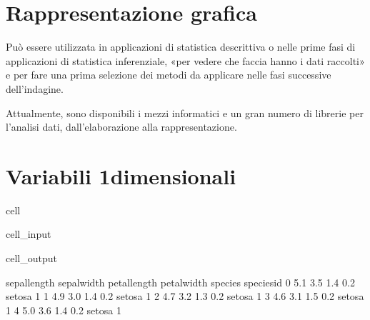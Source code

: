 \documentclass[letterpaper,10pt,italian]{jupyterBook}
\begin{document}
\section{Rappresentazione grafica}
\label{\detokenize{ch/statistics/descriptive:rappresentazione-grafica}}
\sphinxAtStartPar
{} Può essere utilizzata in applicazioni di statistica descrittiva o nelle prime fasi di applicazioni di statistica inferenziale, «per vedere che faccia hanno i dati raccolti» e per fare una prima selezione dei metodi da applicare nelle fasi successive dell’indagine.

\sphinxAtStartPar
Attualmente, sono disponibili i mezzi informatici e un gran numero di librerie per l’analisi dati, dall’elaborazione alla rappresentazione.


\section{Variabili 1\sphinxhyphen{}dimensionali}
\label{\detokenize{ch/statistics/descriptive:variabili-1-dimensionali}}
\begin{sphinxuseclass}{cell}\begin{sphinxVerbatimInput}

\begin{sphinxuseclass}{cell_input}
\begin{sphinxVerbatim}[commandchars=\\\{\}]
   
  
\end{sphinxVerbatim}

\end{sphinxuseclass}\end{sphinxVerbatimInput}
\begin{sphinxVerbatimOutput}

\begin{sphinxuseclass}{cell_output}
\begin{sphinxVerbatim}[commandchars=\\\{\}]
   sepal\PYGZus{}length  sepal\PYGZus{}width  petal\PYGZus{}length  petal\PYGZus{}width species  species\PYGZus{}id
0           5.1          3.5           1.4          0.2  setosa           1
1           4.9          3.0           1.4          0.2  setosa           1
2           4.7          3.2           1.3          0.2  setosa           1
3           4.6          3.1           1.5          0.2  setosa           1
4           5.0          3.6           1.4          0.2  setosa           1
\end{sphinxVerbatim}

\end{sphinxuseclass}\end{sphinxVerbatimOutput}

\end{sphinxuseclass}
\end{document}
